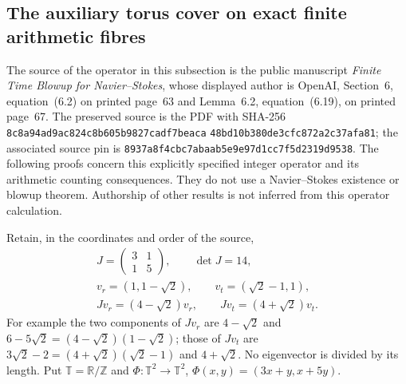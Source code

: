 \subsection{The auxiliary torus cover on exact finite arithmetic fibres}
\label{sec:ns-torus-finite}

The source of the operator in this subsection is the public manuscript
\emph{Finite Time Blowup for Navier--Stokes}, whose displayed author is
OpenAI, Section~6, equation~(6.2) on printed page~63 and Lemma~6.2,
equation~(6.19), on printed page~67.  The preserved source is the PDF
with SHA-256
\texttt{8c8a94ad9ac824c8b605b9827cadf7beaca}\allowbreak%
\texttt{48bd10b380de3cfc872a2c37afa81};
the associated source pin is
\texttt{8937a8f4cbc7abaab5e9e97d1cc7f5d2319d9538}.
The following proofs concern this explicitly specified integer operator
and its arithmetic counting consequences. They do not use a
Navier--Stokes existence or blowup theorem. Authorship of other results
is not inferred from this operator calculation.

Retain, in the coordinates and order of the source,
\[
 \begin{gathered}
 J=\begin{pmatrix}3&1\\1&5\end{pmatrix},\qquad \det J=14,\\
 v_r=(1,1-\sqrt2),\qquad v_t=(\sqrt2-1,1),\\
 Jv_r=(4-\sqrt2)v_r,\qquad Jv_t=(4+\sqrt2)v_t.
 \end{gathered}
\]
For example the two components of $Jv_r$ are $4-\sqrt2$ and
$6-5\sqrt2=(4-\sqrt2)(1-\sqrt2)$; those of $Jv_t$ are
$3\sqrt2-2=(4+\sqrt2)(\sqrt2-1)$ and $4+\sqrt2$.
No eigenvector is divided by its length. Put
$\mathbb T=\mathbb R/\mathbb Z$ and
$\Phi:\mathbb T^2\to\mathbb T^2$, $\Phi(x,y)=(3x+y,x+5y)$.

